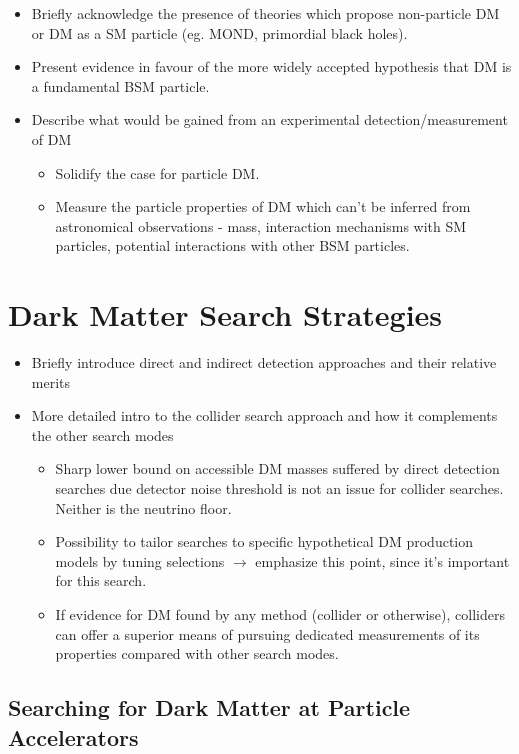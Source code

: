 \begin{itemize}
\item Briefly acknowledge the presence of theories which propose non-particle DM or DM as a SM particle (eg. MOND, primordial black holes).
\item Present evidence in favour of the more widely accepted hypothesis that DM is a fundamental BSM particle.
\item Describe what would be gained from an experimental detection/measurement of DM
\begin{itemize}
\item Solidify the case for particle DM.
\item Measure the particle properties of DM which can't be inferred from astronomical observations - mass, interaction mechanisms with SM particles, potential interactions with other BSM particles.
\end{itemize}
\end{itemize}

\section{Dark Matter Search Strategies}
\begin{itemize}
\item Briefly introduce direct and indirect detection approaches and their relative merits
\item More detailed intro to the collider search approach and how it complements the other search modes
\begin{itemize}
\item Sharp lower bound on accessible DM masses suffered by direct detection searches due detector noise threshold is not an issue for collider searches. Neither is the neutrino floor.
\item Possibility to tailor searches to specific hypothetical DM production models by tuning selections $\rightarrow$ emphasize this point, since it's important for this search.
\item If evidence for DM found by any method (collider or otherwise), colliders can offer a superior means of pursuing dedicated measurements of its properties compared with other search modes.
\end{itemize}
\end{itemize}

\subsection{Searching for Dark Matter at Particle Accelerators}

